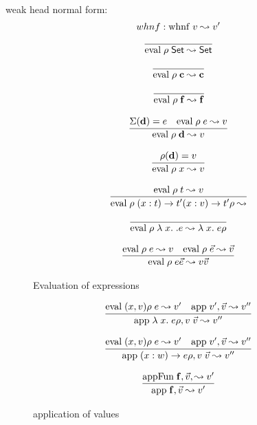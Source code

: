 weak head normal form: 
\[ whnf : \mathrm{whnf}\;v\leadsto v' \]
\begin{figure}[p]

\[\begin{array}{c}
	  \infer{\Eval{\rho}{\Set}{\Set}} 
          {} 
\end{array}
\]

\[
\begin{array}{c}
	  \infer{\Eval{\rho}{\cc}{\cc}} 
          {}

\end{array}
\]

\[\begin{array}{c}
	  \infer{\Eval{\rho}{\ff}{\ff}} 
          {} 
\end{array}
\]

\[\begin{array}{c}
	  \infer{\Eval{\rho}{\dd}{v}} 
          {\Lookup{\Sigma}{\dd}{e} & \Eval{\rho}{e}{v}} 
\end{array}
\]

\[\begin{array}{c}
	  \infer{\Eval{\rho}{x}{v}} 
          {\Lookup{\rho}{\dd}{v}} 
\end{array}
\]

\[\begin{array}{c}
	  \infer{\Eval{\rho}{\EPi{x}{t}{t'}{\EPi{x}{v}{t'}{\rho}}}}
          {\Eval{\rho}{t}{v}}
\end{array}
\]

\[\begin{array}{c}
	  \infer{\Eval{\rho}{\lam x . e}{\lam{x}{e}{\rho}}}
		{} 
\end{array}
\]


\[
\begin{array}{c}
          
	  \infer{\Eval{\rho}{e \vec{e}}{v \vec{v}}}
          {\Eval{\rho}{e}{v} & \Eval{\rho}{\vec{e}}{\vec{v}}}
\end{array}
\]
\caption{Evaluation of expressions}
\end{figure}

\begin{figure}[p]

\[
\begin{array}{c}
          
	  \infer{\App{\lam{x}{e}{\rho}}{v \; \vec{v}}{v''}}
          {\Eval{(x,v)\rho}{e}{v'} & \App{v'}{\vec{v}}{v''}}
\end{array}
\]

\[
\begin{array}{c}
          
	  \infer{\App{\EPi{x}{w}{e}{\rho}}{v \; \vec{v}}{v''}}
          {\Eval{(x,v)\rho}{e}{v'} & \App{v'}{\vec{v}}{v''}}

\end{array}
\]

\[
\begin{array}{c}
          
	  \infer{\App{\ff}{\vec{v}}{v'}}
          {\AppFun{\ff}{\vec{v}}{v'}}
\end{array}
\]

\caption{application of values}
\end{figure}


